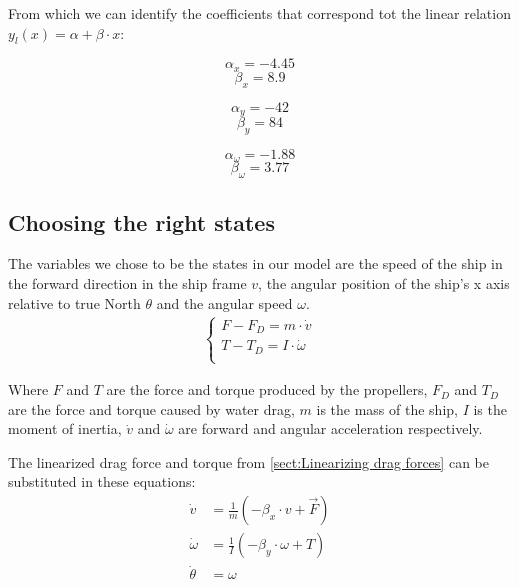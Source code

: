 From which we can identify the coefficients that correspond tot the linear relation $ y_{l}(x) = \alpha + \beta \cdot x $:\\
\begin{minipage}{0.3\linewidth}
\[ \alpha_{x} = -4.45 \]
\[ \beta_{x} = 8.9 \]
\end{minipage}
\begin{minipage}{0.3\linewidth}
\[ \alpha_{y} = -42 \] 
\[ \beta_{y} = 84 \]
\end{minipage}
\begin{minipage}{0.3\linewidth}
\[ \alpha_{\omega} = -1.88 \]
\[ \beta_{\omega} = 3.77 \]
\end{minipage}


\subsection{Choosing the right states}

The variables we chose to be the states in our model are the speed of the ship in the forward direction in the ship frame $v$, the angular position of the ship's x axis relative to true North $\theta$ and the angular speed $\omega$.\\
\begin{align}\begin{cases}
F - F_{D} = m \cdot \dot{v}\\
T - T_{D} = I \cdot \dot{\omega}\\
\end{cases}\end{align}

Where $ F $ and $ T $ are the force and torque produced by the propellers, $ F_{D} $ and $ T_{D} $ are the force and torque caused by water drag, $ m $ is the mass of the ship, $ I $ is the moment of inertia, $ \dot{v} $  and $ \dot{\omega} $ are forward and angular acceleration respectively.

The linearized drag force and torque from \ref{sect:Linearizing drag forces} can be substituted in these equations:
\begin{align}
 \dot{v} &= \frac{1}{m}(- \beta_{x} \cdot v + \vec{F})\\
 \dot{\omega} &= \frac{1}{I}(-\beta_{y} \cdot \omega + T)\\
 \dot{\theta} &= \omega
\end{align}

